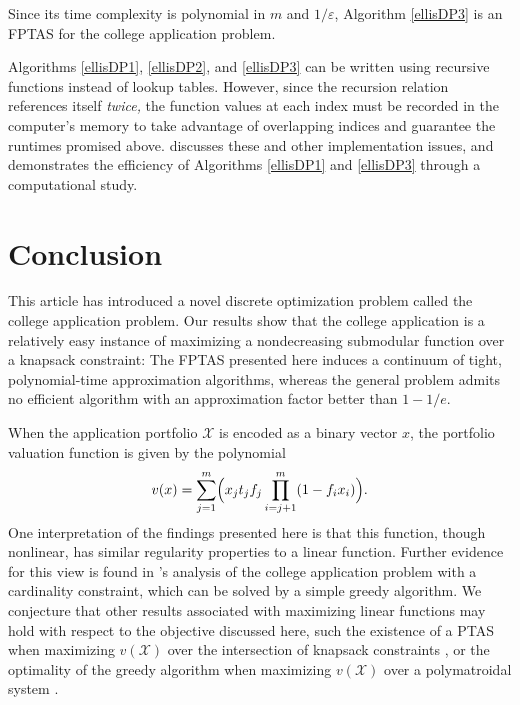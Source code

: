 Since its time complexity is polynomial in $m$ and $1 / \varepsilon$, Algorithm \ref{ellisDP3} is an FPTAS for the college application problem.

Algorithms \ref{ellisDP1}, \ref{ellisDP2}, and \ref{ellisDP3} can be written using recursive functions instead of lookup tables. However, since the recursion relation references itself \emph{twice,} the function values at each index must be recorded in the computer's memory to take advantage of overlapping indices and guarantee the runtimes promised above. \cite{kapur2022} discusses these and other implementation issues, and demonstrates the efficiency of Algorithms \ref{ellisDP1} and \ref{ellisDP3} through a computational study.









\section{Conclusion} \label{sectionConclusion}

This article has introduced a novel discrete optimization problem called the college application problem. Our results show that the college application is a relatively easy instance of maximizing a nondecreasing submodular function over a knapsack constraint: The FPTAS presented here induces a continuum of tight, polynomial-time approximation algorithms, whereas the general problem admits no efficient algorithm with an approximation factor better than $1 - 1/e$.

When the application portfolio $\mathcal{X}$ is encoded as a binary vector $x$, the portfolio valuation function is given by the polynomial
\begin{equation} 
v(x) = \sum_{j=1}^m \Bigl( x_j t_j f_j \prod_{i = j+1}^m (1 - f_{i} x_{i}) \Bigr). \label{closedformportfoliovaluationx}\end{equation}
One interpretation of the findings presented here is that this function, though nonlinear, has similar regularity properties to a linear function. Further evidence for this view is found in \cite{kapur2022}'s analysis of the college application problem with a cardinality constraint, which can be solved by a simple greedy algorithm. We conjecture that other results associated with maximizing linear functions may hold with respect to the objective discussed here, such the existence of a PTAS when maximizing $v(\mathcal{X})$ over the intersection of knapsack constraints \cite{chekuriandkhanna2005}, or the optimality of the greedy algorithm when maximizing $v(\mathcal{X})$ over a polymatroidal system \cite{edmonds1971}.
